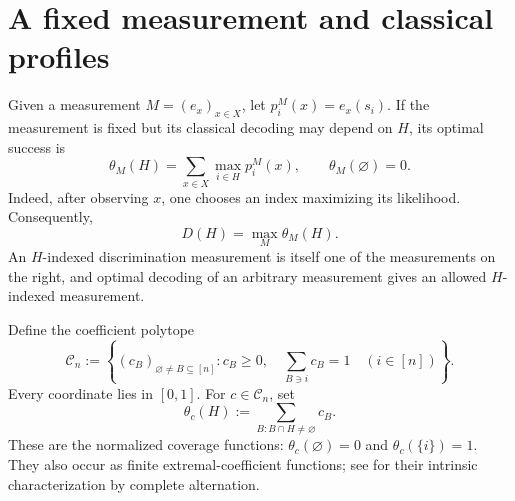 \documentclass[a4paper,11pt,onecolumn,unpublished]{quantumarticle}
\theoremstyle{definition}
\newcommand{\1}{\mathbf 1}
\newcommand{\Coeff}{\mathcal C}
\begin{document}
\section{A fixed measurement and classical profiles}\label{sec:coverage}

Given a measurement $M=(e_x)_{x\in X}$, let $p_i^M(x)=e_x(s_i)$. If the
measurement is fixed but its classical decoding may depend on $H$, its optimal
success is
\begin{equation}\label{eq:theta-M}
 \theta_M(H)=\sum_{x\in X}\max_{i\in H}p_i^M(x),
 \qquad\theta_M(\varnothing)=0.
\end{equation}
Indeed, after observing $x$, one chooses an index maximizing its likelihood.
Consequently,
\begin{equation}\label{eq:decode}
 D(H)=\max_M\theta_M(H).
\end{equation}
An $H$-indexed discrimination measurement is itself one of the measurements on
the right, and optimal decoding of an arbitrary measurement gives an allowed
$H$-indexed measurement.

Define the coefficient polytope
\begin{equation}\label{eq:Coeff}
 \Coeff_n:=\left\{(c_B)_{\varnothing\ne B\subseteq[n]}:
 c_B\ge0,\quad\sum_{B\ni i}c_B=1\quad(i\in[n])\right\}.
\end{equation}
Every coordinate lies in $[0,1]$. For $c\in\Coeff_n$, set
\begin{equation}\label{eq:coverage}
 \theta_c(H):=\sum_{B:B\cap H\ne\varnothing}c_B.
\end{equation}
These are the normalized coverage functions: $\theta_c(\varnothing)=0$ and
$\theta_c(\{i\})=1$. They also occur as finite extremal-coefficient functions;
see \cite{StrokorbSchlather2015} for their intrinsic characterization by
complete alternation.
\end{document}

